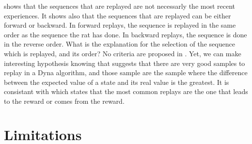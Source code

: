 \documentclass[]{article}
\begin{document}
\textcite{gupta_hippocampal_2010} shows that the sequences that are replayed are not necessarly the most recent experiences. It shows also that the sequences that are replayed can be either forward or backward. In forward replays, the sequence is replayed in the same order as the sequence the rat has done. In backward replays, the sequence is done in the reverse order. What is the explanation for the selection of the sequence which is replayed, and its order? No criteria are proposed in \textcite{gupta_hippocampal_2010}. Yet, we can make interesting hypothesis knowing that \textcite{sutton_dyna-style_2012} suggests that there are very good samples to replay in a Dyna algorithm, and those sample are the sample where the difference between the expected value of a state and its real value is the greatest. It is consistant with \textcite{gupta_hippocampal_2010} which states that the most common replays are the one that leads to the reward or comes from the reward.

\section{Limitations}\label{limitations}


\printbibliography{}
\end{document}
